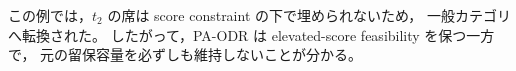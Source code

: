 \documentclass[
  12pt,
  a4paper,
  oneside,
  onecolumn,
  titlepage,
  final
]{jsarticle}
\newcommand{\1}{\mathbf{1}}
\begin{document}
この例では，$t_2$ の席は score constraint の下で埋められないため，
一般カテゴリへ転換された。
したがって，PA-ODR は elevated-score feasibility を保つ一方で，
元の留保容量を必ずしも維持しないことが分かる。








\end{document}
